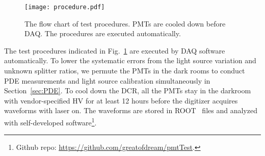 \begin{figure}
    \centering
    \texttt{[image: procedure.pdf]}
    \caption{The flow chart of test procedures. PMTs are cooled down before DAQ. The procedures are executed automatically.}
    \label{fig:testingprocedure}
\end{figure}

The test procedures indicated in Fig.~\ref{fig:testingprocedure} are executed by DAQ software automatically. To lower the systematic errors from the light source variation and unknown splitter ratios, we permute the PMTs in the dark rooms to conduct PDE measurements and light source calibration simultaneously in Section~\ref{sec:PDE}. To cool down the DCR, all the PMTs stay in the darkroom with vendor-specified HV for at least 12 hours before the digitizer acquires waveforms with laser on. The waveforms are stored in ROOT~\cite{brun_root_1997} files and analyzed with self-developed software\footnote{Github repo: \url{https://github.com/greatofdream/pmtTest}.}.
